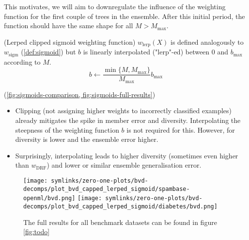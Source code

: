 \documentclass[../main.tex]{subfiles}
\begin{document}
This motivates, we will aim to downregulate the influence of the weighting function for the first couple of trees in the ensemble. After this initial period, the function should have the same shape for all $M > M_{\text{max}}$.

\begin{definition} (Lerped clipped sigmoid weighting function)
$w_{\text{lerp}}(X)$ is defined analogously to $w_\text{sigm}$ (\cf \ref{def:sigmoid}) but $b$ is linearly interpolated ("lerp"-ed) between $0$ and $b_{\text{max}}$ according to $M$.
$$
b \gets \frac{\min \{ M, M_{\text{max}} \}}{M_{\text{max} }} b_{\text{max} }
$$
\end{definition}

\begin{observation} (\cf \cref{fig:sigmoids-comparison, fig:sigmoids-full-results}) %
    \begin{itemize}
        \item Clipping (not assigning higher weights to incorrectly classified examples) already mitigates the spike in member error and diversity. Interpolating the steepness of the weighting function $b$ is not required for this. However, for diversity is lower and the ensemble error higher.
        \item Surprisingly, interpolating leads to higher diversity (sometimes even higher than $w_\text{DRF}$) and lower or similar ensemble generalisation error.
    \end{itemize}
\end{observation}


\begin{figure*}
    \texttt{[image: symlinks/zero-one-plots/bvd-decomps/plot\_bvd\_capped\_lerped\_sigmoid/spambase-openml/bvd.png]}
    \texttt{[image: symlinks/zero-one-plots/bvd-decomps/plot\_bvd\_capped\_lerped\_sigmoid/diabetes/bvd.png]}
    \caption{
        The full results for all benchmark datasets can be found in figure \ref{fig:todo}
    }
    \label{fig:sigmoids-comparison}
\end{figure*}
\end{document}
